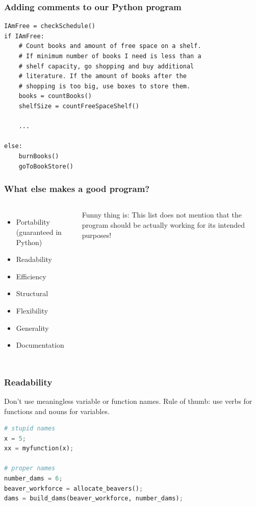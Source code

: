  \begin{frame}[fragile]
  \frametitle{Adding comments to our Python program}
  \centering{}
  \begin{lstlisting}
IAmFree = checkSchedule()
if IAmFree:
    # Count books and amount of free space on a shelf. 
    # If minimum number of books I need is less than a 
    # shelf capacity, go shopping and buy additional 
    # literature. If the amount of books after the 
    # shopping is too big, use boxes to store them.
    books = countBooks()
    shelfSize = countFreeSpaceShelf()
    
    ...
    
else:
    burnBooks()
    goToBookStore()
 \end{lstlisting}
 \end{frame}

\begin{frame}
  \frametitle{What else makes a good program?}
  \begin{columns}[T]
        \begin{itemize}
            \item Portability (guaranteed in Python)
            \item Readability
            \item Efficiency 
            \item Structural
            \item Flexibility
            \item Generality
            \item Documentation
        \end{itemize}
Funny thing is: This list does not mention that the program should be actually working for its intended purposes!
    \end{columns}
\end{frame}

\begin{frame}[fragile]
  \frametitle{Readability}
  Don't use meaningless variable or function names. Rule of thumb: use verbs for functions and nouns for variables.
  \vspace*{2em}
  \begin{lstlisting}[language=Python]
# stupid names
x = 5;
xx = myfunction(x);

# proper names
number_dams = 6;
beaver_workforce = allocate_beavers();
dams = build_dams(beaver_workforce, number_dams);
  \end{lstlisting}
\end{frame}

